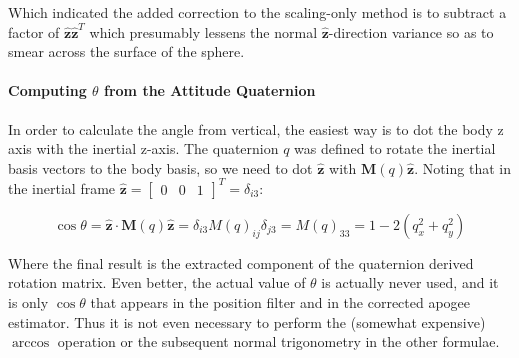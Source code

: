 \documentclass{article}
\renewcommand{\vec}{\boldsymbol} %
\newcommand{\mat}{\vec}
\newcommand{\uvec}[1]{\vec{\hat{#1}}}
\newcommand{\bmat}[1]{\begin{bmatrix} #1 \end{bmatrix}}
\begin{document}
	Which indicated the added correction to the scaling-only method is to subtract a factor of $\uvec{z}\uvec{z}^T$ which presumably lessens the normal $\uvec{z}$-direction variance so as to smear across the surface of the sphere.
	
	\paragraph{Computing $\theta$ from the Attitude Quaternion}
	
	In order to calculate the angle from vertical, the easiest way is to dot the body z axis with the inertial z-axis.  The quaternion $q$ was defined to rotate the inertial basis vectors to the body basis, so we need to dot $\uvec{z}$ with $\mat{M}(q)\uvec{z}$.  Noting that in the inertial frame $\uvec{z} = \bmat{0&0&1}^T = \delta_{i3}$:
	
	\begin{equation}
		\cos\theta = \uvec{z} \cdot \mat{M}(q)\uvec{z} = \delta_{i3} M(q)_{ij} \delta_{j3} = M(q)_{33} = 1-2\left(q_x^2+q_y^2\right)
	\end{equation} 
	
	Where the final result is the extracted component of the quaternion derived rotation matrix.  Even better, the actual value of $\theta$ is actually never used, and it is only $\cos\theta$ that appears in the position filter and in the corrected apogee estimator.  Thus it is not even necessary to perform the (somewhat expensive) $\arccos$ operation or the subsequent normal trigonometry in the other formulae.
	
\end{document}
